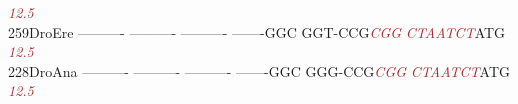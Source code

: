 \documentclass[11pt,twoside,reqno,a4paper]{article}
\begin{document}
{\hspace*{4\charwidth}\hspace*{7\charwidth}\hspace*{1\charwidth}\hspace*{1\charwidth}\hspace*{1\charwidth}\hspace*{1\charwidth}\hspace*{47\charwidth}\textit{\textcolor{Brown}{12.5}}\hspace*{1\charwidth}\hspace*{1\charwidth}\\
259\hspace*{1\charwidth}DroEre	----------	----------	----------	-------GGC	GGT-CCG\textit{\textcolor{Brown}{C}}\textit{\textcolor{Brown}{G}}\textit{\textcolor{Brown}{G}}	\textit{\textcolor{Brown}{C}}\textit{\textcolor{Brown}{T}}\textit{\textcolor{Brown}{A}}\textit{\textcolor{Brown}{A}}\textit{\textcolor{Brown}{T}}\textit{\textcolor{Brown}{C}}\textit{\textcolor{Brown}{T}}ATG	\\
\hspace*{4\charwidth}\hspace*{7\charwidth}\hspace*{1\charwidth}\hspace*{1\charwidth}\hspace*{1\charwidth}\hspace*{1\charwidth}\hspace*{47\charwidth}\textit{\textcolor{Brown}{12.5}}\hspace*{1\charwidth}\hspace*{1\charwidth}\\
228\hspace*{1\charwidth}DroAna	----------	----------	----------	-------GGC	GGG-CCG\textit{\textcolor{Brown}{C}}\textit{\textcolor{Brown}{G}}\textit{\textcolor{Brown}{G}}	\textit{\textcolor{Brown}{C}}\textit{\textcolor{Brown}{T}}\textit{\textcolor{Brown}{A}}\textit{\textcolor{Brown}{A}}\textit{\textcolor{Brown}{T}}\textit{\textcolor{Brown}{C}}\textit{\textcolor{Brown}{T}}ATG	\\
\hspace*{4\charwidth}\hspace*{7\charwidth}\hspace*{1\charwidth}\hspace*{1\charwidth}\hspace*{1\charwidth}\hspace*{1\charwidth}\hspace*{47\charwidth}\textit{\textcolor{Brown}{12.5}}\hspace*{1\charwidth}\hspace*{1\charwidth}\\
}
\end{document}
